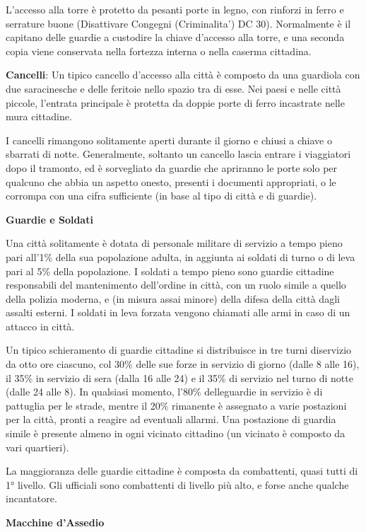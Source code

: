 \documentclass[a4paper,11pt,twoside,openany]{book}
\begin{document}
L'accesso alla torre è protetto da pesanti porte in legno, con rinforzi in ferro e serrature buone (Disattivare Congegni (Criminalita') DC 30). Normalmente è il capitano delle guardie a custodire la chiave d'accesso alla torre, e una seconda copia viene conservata nella fortezza interna o nella caserma cittadina.

\textbf{Cancelli}: Un tipico cancello d'accesso alla città è composto da una guardiola con due saracinesche e delle feritoie nello spazio tra di esse. Nei paesi e nelle città piccole, l'entrata principale è protetta da doppie porte di ferro incastrate nelle mura cittadine.

I cancelli rimangono solitamente aperti durante il giorno e chiusi a chiave o sbarrati di notte. Generalmente, soltanto un cancello lascia entrare i viaggiatori dopo il tramonto, ed è sorvegliato da guardie che apriranno le porte solo per qualcuno che abbia un aspetto onesto, presenti i documenti appropriati, o le corrompa con una cifra sufficiente (in base al tipo di città e di guardie).

\textbf{Guardie e Soldati}

Una città solitamente è dotata di personale militare di servizio a tempo pieno pari all'1\% della sua popolazione adulta, in aggiunta ai soldati di turno o di leva pari al 5\% della popolazione. I soldati a tempo pieno sono guardie cittadine responsabili del mantenimento dell'ordine in città, con un ruolo simile a quello della polizia moderna, e (in misura assai minore) della difesa della città dagli assalti esterni. I soldati in leva forzata vengono chiamati alle armi in caso di un attacco in città.

Un tipico schieramento di guardie cittadine si distribuisce in tre turni diservizio da otto ore ciascuno, col 30\% delle sue forze in servizio di giorno (dalle 8 alle 16), il 35\% in servizio di sera (dalla 16 alle 24) e il 35\% di servizio nel turno di notte (dalle 24 alle 8). In qualsiasi momento, l'80\% delleguardie in servizio è di pattuglia per le strade, mentre il 20\% rimanente è assegnato a varie postazioni per la città, pronti a reagire ad eventuali allarmi. Una postazione di guardia simile è presente almeno in ogni vicinato cittadino (un vicinato è composto da vari quartieri).

La maggioranza delle guardie cittadine è composta da combattenti, quasi tutti di 1° livello. Gli ufficiali sono combattenti di livello più alto, e forse anche qualche incantatore.

\textbf{Macchine d'Assedio}
\end{document}
